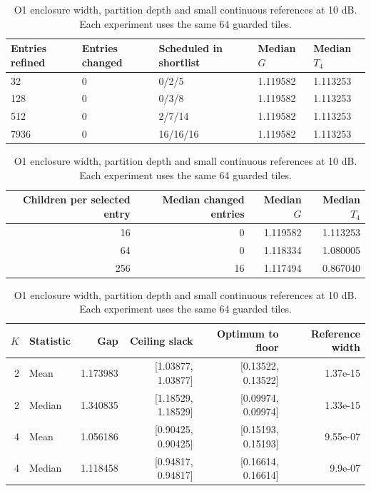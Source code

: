 \begin{table}[htbp]\centering\small
\setlength{\tabcolsep}{4pt}
\caption{O1 enclosure width, partition depth and small continuous references at 10 dB. Each experiment uses the same 64 guarded tiles.}\label{supp:refinement}
\begin{tabular}{lllll}\toprule
Entries refined & Entries changed & Scheduled in shortlist & Median $G$ & Median $T_4$\\
\midrule
32 & 0 & 0/2/5 & 1.119582 & 1.113253\\
128 & 0 & 0/3/8 & 1.119582 & 1.113253\\
512 & 0 & 2/7/14 & 1.119582 & 1.113253\\
7936 & 0 & 16/16/16 & 1.119582 & 1.113253\\
\bottomrule\end{tabular}
\par\medskip\begin{minipage}{\linewidth}\small
\par\smallskip\noindent\begin{tabular}{rrrr}\toprule Children per selected entry & Median changed entries & Median $G$ & Median $T_4$\\\midrule
16 & 0 & 1.119582 & 1.113253\\
64 & 0 & 1.118334 & 1.080005\\
256 & 16 & 1.117494 & 0.867040\\
\bottomrule\end{tabular}\par\smallskip
\noindent\begin{tabular}{rlrrrr}\toprule $K$ & Statistic & Gap & Ceiling slack & Optimum to floor & Reference width\\\midrule
2 & Mean & 1.173983 & [1.03877, 1.03877] & [0.13522, 0.13522] & 1.37e-15\\
2 & Median & 1.340835 & [1.18529, 1.18529] & [0.09974, 0.09974] & 1.33e-15\\
4 & Mean & 1.056186 & [0.90425, 0.90425] & [0.15193, 0.15193] & 9.55e-07\\
4 & Median & 1.118458 & [0.94817, 0.94817] & [0.16614, 0.16614] & 9.9e-07\\
\bottomrule\end{tabular}\par\smallskip

\end{minipage}
\end{table}
